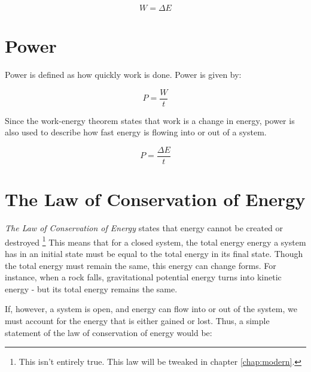 		\begin{mdframed}[backgroundcolor=orange!20!white]
		\begin{equation}
			W = \Delta E
			\label{equation:workenergy}
		\end{equation}
	\end{mdframed}
	
		\section{Power}
	
	
	Power is defined as how quickly work is done.  Power is given by:
	
	\begin{mdframed}[backgroundcolor=orange!20!white]
		\begin{equation}
			P = \frac{W}{t}
			\label{equation:power}
		\end{equation}
	\end{mdframed}
	
	Since the work-energy theorem states that work is a change in energy, power is also used to describe how fast energy is flowing into or out of a system.
	
	\begin{mdframed}[backgroundcolor=orange!20!white]
		\begin{equation}
			P = \frac{\Delta E}{t}
			\label{equation:poweralt}
		\end{equation}
	\end{mdframed}
	

	
	
	\section{The Law of Conservation of Energy}
	\textit{The Law of Conservation of Energy} states that energy cannot be created or destroyed \footnote{This isn't entirely true.  This law will be tweaked in chapter \ref{chap:modern}.  }  This means that for a closed system, the total energy energy a system has in an initial state must be equal to the total energy in its final state.  Though the total energy must remain the same, this energy can change forms.  For instance, when a rock falls, gravitational potential energy turns into kinetic energy - but its total energy remains the same.  
	
	
	
	
	If, however, a system is open, and energy can flow into or out of the system, we must account for the energy that is either gained or lost.  Thus, a simple statement of the law of conservation of energy would be:
	
